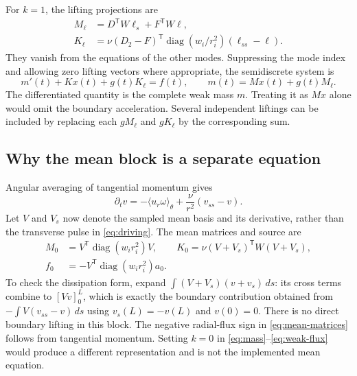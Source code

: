 For \(k=1\), the lifting projections are
\begin{equation}
 \begin{aligned}
 M_\ell&=D^{\mathsf T}W\ell_s+F^{\mathsf T}W\ell,\\
 K_\ell&=\nu(D_2-F)^{\mathsf T}
       \operatorname{diag}(w_i/r_i^2)(\ell_{ss}-\ell).
 \end{aligned}
 \label{eq:lift-projections}
\end{equation}
They vanish from the equations of the other modes. Suppressing the
mode index and allowing zero lifting vectors where appropriate, the
semidiscrete system is
\begin{equation}
 m'(t)+Kx(t)+g(t)K_\ell=f(t),\qquad
 m(t)=Mx(t)+g(t)M_\ell.
 \label{eq:semidiscrete}
\end{equation}
The differentiated quantity is the complete weak mass \(m\). Treating
it as \(Mx\) alone would omit the boundary acceleration. Several
independent liftings can be included by replacing each \(gM_\ell\)
and \(gK_\ell\) by the corresponding sum.

\subsection{Why the mean block is a separate equation}

Angular averaging of tangential momentum gives
\begin{equation}
 \partial_t v=-\langle u_r\omega\rangle_\theta
       +\frac{\nu}{r^2}(v_{ss}-v).
 \label{eq:mean-equation}
\end{equation}
Let \(V\) and \(V_s\) now denote the sampled mean basis and its
derivative, rather than the transverse pulse in
\eqref{eq:driving}. The mean matrices and source are
\begin{equation}
 \begin{aligned}
 M_0&=V^{\mathsf T}\operatorname{diag}(w_i r_i^2)V,\qquad
 K_0=\nu(V+V_s)^{\mathsf T}W(V+V_s),\\
 f_0&=-V^{\mathsf T}\operatorname{diag}(w_i r_i^2)a_0.
 \end{aligned}
 \label{eq:mean-matrices}
\end{equation}
To check the dissipation form, expand
\(\int(V+V_s)(v+v_s)\,ds\): its cross terms combine to
\([Vv]_0^L\), which is exactly the boundary contribution obtained
from \(-\int V(v_{ss}-v)\,ds\) using \(v_s(L)=-v(L)\) and
\(v(0)=0\). There is no direct boundary lifting in this block.
The negative radial-flux sign in \eqref{eq:mean-matrices} follows
from tangential momentum. Setting \(k=0\) in
\eqref{eq:mass}--\eqref{eq:weak-flux} would produce a different
representation and is not the implemented mean equation.

